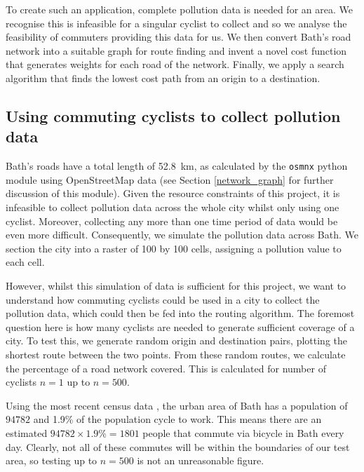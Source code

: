 \documentclass[11pt,twosided,a4paper]{report}
\begin{document}
To create such an application, complete pollution data is needed for an area. We recognise this is infeasible for a singular cyclist to collect and so we analyse the feasibility of commuters providing this data for us. We then convert Bath's road network into a suitable graph for route finding and invent a novel cost function that generates weights for each road of the network. Finally, we apply a search algorithm that finds the lowest cost path from an origin to a destination. 

\subsection{Using commuting cyclists to collect pollution data}
% 

Bath's roads have a total length of 52.8~km, as calculated by the \texttt{osmnx} python module using OpenStreetMap data (see Section \ref{network_graph} for further discussion of this module). Given the resource constraints of this project, it is infeasible to collect pollution data across the whole city whilst only using one cyclist. Moreover, collecting any more than one time period of data would be even more difficult. Consequently, we simulate the pollution data across Bath. We section the city into a raster of 100 by 100 cells, assigning a pollution value to each cell.

However, whilst this simulation of data is sufficient for this project, we want to understand how commuting cyclists could be used in a city to collect the pollution data, which could then be fed into the routing algorithm. The foremost question here is how many cyclists are needed to generate sufficient coverage of a city. To test this, we generate random origin and destination pairs, plotting the shortest route between the two points. From these random routes, we calculate the percentage of a road network covered. This is calculated for number of cyclists $n=1$ up to $n=500$.

Using the most recent census data \citep{ons2011census}, the urban area of Bath has a population of $94782$ and 1.9\% of the population cycle to work. This means there are an estimated $94782 \times 1.9\% = 1801$ people that commute via bicycle in Bath every day. Clearly, not all of these commutes will be within the boundaries of our test area, so testing up to $n=500$ is not an unreasonable figure.
\end{document}
